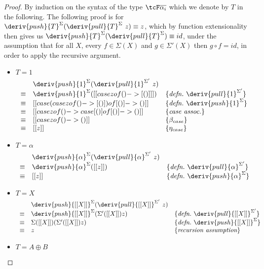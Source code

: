 \begin{proof}
By induction on the syntax of the type $\tcF \overline{\alpha_i}$ which we denote
by $T$ in the following. The following proof is for
$\deriv{push}{T}^\Sigma(\deriv{pull}{T}^\Sigma \ z) \equiv z$, which by
function extensionality then gives us
$\deriv{push}{T}^\Sigma(\deriv{pull}{T}^\Sigma) \equiv id$,
under the assumption that for all $X$, every $f \in \Sigma(X)$ and $g \in
\Sigma'(X)$ then $g \circ f = id$, in order to apply the recursive argument.
%
\begin{itemize}
\item $T = 1$
%
\begin{align*}
\begin{array}{rll}
       & \deriv{push}{1}^\Sigma(\deriv{pull}{1}^{\Sigma'} \ z) & \\
%
\equiv & \deriv{push}{1}^{\Sigma}( [[ case z of () -> [ () ] ]] )
& \{\textit{defn.}\ \deriv{pull}{1}^{\Sigma'} \} \\
%
\equiv & [[ case (case z of () -> [ () ]) of [ () ] -> () ]]
& \{\textit{defn.}\ \deriv{push}{1}^{\Sigma} \} \\
\equiv & [[ case z of () -> case [ () ] of [ () ] -> () ]]
& \{\textit{case assoc.} \} \\
%
\equiv &  [[ case z of () -> () ]]
& \{\beta_{case} \} \\
%
\equiv & [[ z ]]
& \{\eta_{case} \}
\end{array}
\end{align*}
\item $T = \alpha$
%
\begin{align*}
\begin{array}{rll}
       & \deriv{push}{\alpha}^\Sigma(\deriv{pull}{\alpha}^{\Sigma'} \ z) & \\
%
\equiv & \deriv{push}{\alpha}^\Sigma([[ z ]])
& \{\textit{defn.}\ \deriv{pull}{\alpha}^{\Sigma'} \} \\
%
\equiv & [[ z ]] & \{\textit{defn.}\ \deriv{push}{\alpha}^\Sigma \}
\end{array}
\end{align*}
%
\item $T = X$
%
\begin{align*}
\begin{array}{rll}
       & \deriv{push}{[[ X ]]}^{\Sigma}(\deriv{pull}{[[ X ]]}^{\Sigma'} \ z) & \\
%
\equiv &  \deriv{push}{[[ X ]]}^{\Sigma}(\Sigma' ([[X]]) z) & \{\textit{defn.}\ \deriv{pull}{[[ X ]]}^{\Sigma'} \}
\\
\equiv & \Sigma ([[ X ]]) (\Sigma' ([[X]]) z) & \{\textit{defn.}\ \deriv{push}{[[ X ]]}^{\Sigma} \} \\
\equiv & z & \{ \textit{recursion assumption}\}
\end{array}
\end{align*}
%
\item $T = A \oplus B$
%


\end{itemize}
\end{proof}
